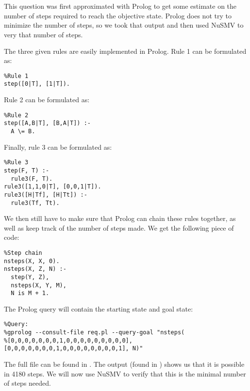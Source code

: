\chapter{}\label{chp:2}

This question was first approximated with Prolog to get some estimate on the number of steps required to reach the objective state. Prolog does not try to minimize the number of steps, so we took that output and then used NuSMV to very that number of steps.

The three given rules are easily implemented in Prolog. Rule 1 can be formulated as:

\begin{lstlisting}
%Rule 1
step([0|T], [1|T]).
\end{lstlisting}

Rule 2 can be formulated as:

\begin{lstlisting}
%Rule 2
step([A,B|T], [B,A|T]) :-
  A \= B.
\end{lstlisting}

Finally, rule 3 can be formulated as:

\begin{lstlisting}
%Rule 3
step(F, T) :-
  rule3(F, T).
rule3([1,1,0|T], [0,0,1|T]).
rule3([H|Tf], [H|Tt]) :-
  rule3(Tf, Tt).
\end{lstlisting}

We then still have to make sure that Prolog can chain these rules together, as well as keep track of the number of steps made. We get the following piece of code:

\begin{lstlisting}
%Step chain
nsteps(X, X, 0).
nsteps(X, Z, N) :-
  step(Y, Z),
  nsteps(X, Y, M),
  N is M + 1.
\end{lstlisting}

The Prolog query will contain the starting state and goal state:

\begin{lstlisting}
%Query:
%gprolog --consult-file req.pl --query-goal "nsteps(
%[0,0,0,0,0,0,0,1,0,0,0,0,0,0,0,0,0], [0,0,0,0,0,0,0,1,0,0,0,0,0,0,0,0,1], N)"
\end{lstlisting}

The full file can be found in . The output (found in ) shows us that it is possible in 4180 steps. We will now use NuSMV to verify that this is the minimal number of steps needed. 

